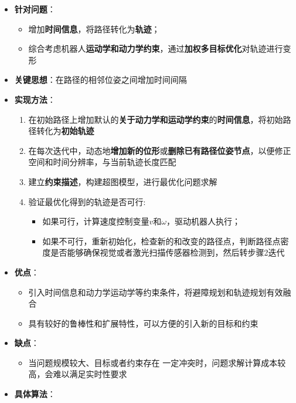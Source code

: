 \documentclass[../main.tex]{subfiles}
\begin{document}
\begin{enumerate}
\begin{itemize}
            \item \textbf{针对问题}：
                \begin{itemize}
                    \item 增加\textbf{时间信息}，将路径转化为\textbf{轨迹}；
                    \item 综合考虑机器人\textbf{运动学和动力学约束}，通过\textbf{加权多目标优化}对轨迹进行变形
                \end{itemize}
            \item \textbf{关键思想}：在路径的相邻位姿之间增加时间间隔
            \item \textbf{实现方法}：
                \begin{enumerate}
                    \item 在初始路径上增加默认的\textbf{关于动力学和运动学约束}的\textbf{时间信息}，将初始路径转化为\textbf{初始轨迹}
                    \item 在每次迭代中，动态地\textbf{增加新的位形}或\textbf{删除已有路径位姿节点}，以便修正空间和时间分辨率，与当前轨迹长度匹配
                    \item 建立\textbf{约束描述}，构建超图模型，进行最优化问题求解
                    \item 验证最优化得到的轨迹是否可行:
                        \begin{itemize}
                            \item 如果可行，计算速度控制变量$v$和$\omega$，驱动机器人执行；
                            \item 如果不可行，重新初始化，检查新的和改变的路径点，判断路径点密度是否能够确保视觉或者激光扫描传感器检测到，然后转步骤2迭代
                        \end{itemize}
                \end{enumerate}
            \item \textbf{优点}：
                \begin{itemize}
                    \item 引入时间信息和动力学运动学等约束条件，将避障规划和轨迹规划有效融合
                    \item 具有较好的鲁棒性和扩展特性，可以方便的引入新的目标和约束
                \end{itemize}
            \item \textbf{缺点}：
                \begin{itemize}
                    \item 当问题规模较大、目标或者约束存在 一定冲突时，问题求解计算成本较高，会难以满足实时性要求
                \end{itemize}
            \item \textbf{具体算法}：
                \small{}
\end{itemize}
\end{enumerate}
\end{document}
